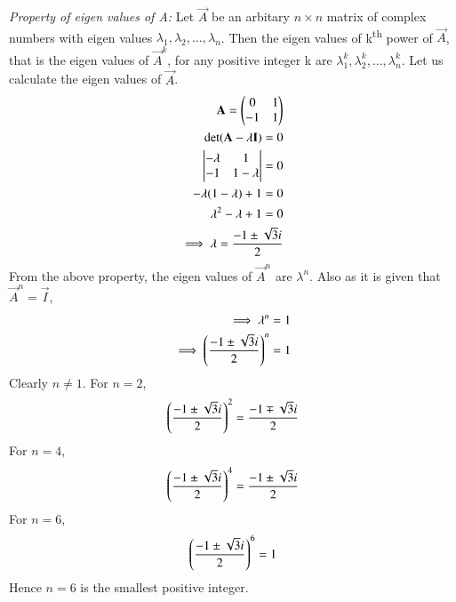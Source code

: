 {\em Property of eigen values of A: }
Let $\vec{A}$ be an arbitary $n\times n$ matrix of complex numbers with eigen values $\lambda_1,\lambda_2,\hdots,\lambda_n$. Then  the eigen values of k\textsuperscript{th} power of $\vec{A}$, that is the eigen values of $\vec{A}^k$, for any positive integer k are $\lambda_1^k,\lambda_2^k,\hdots,\lambda_n^k$.
Let us calculate the eigen values of $\vec{A}$.
\begin{align}
\mathbf{A}=\begin{pmatrix}0&1\\-1&1\end{pmatrix}\\
\det({\mathbf{A}-\lambda\mathbf{I}})=0\\
\begin{vmatrix}-\lambda&1\\-1&1-\lambda\end{vmatrix}=0\\
-\lambda(1-\lambda)+1=0\\
\lambda^2-\lambda+1=0\\
\implies \lambda=\frac{-1\pm \sqrt{3}i}{2}
\end{align}
From the above property,
the eigen values of $\vec{A}^n$ are $\lambda^n$. Also as it is given that $\vec{A}^n=\vec{I}$, 
\begin{align}
\implies \lambda^n=1\\
\implies \left(\frac{-1\pm \sqrt{3}i}{2}\right)^n=1
\end{align}
Clearly $n\ne 1$. For $n=2$,
\begin{align}
\left(\frac{-1\pm \sqrt{3}i}{2}\right)^2=\frac{-1\mp \sqrt{3}i}{2}
\end{align}
For $n=4$,
\begin{align}
\left(\frac{-1\pm \sqrt{3}i}{2}\right)^4=\frac{-1\pm \sqrt{3}i}{2}
\end{align}
For $n=6$,
\begin{align}
\left(\frac{-1\pm \sqrt{3}i}{2}\right)^6=1
\end{align}
Hence $n=6$ is the smallest positive integer.
